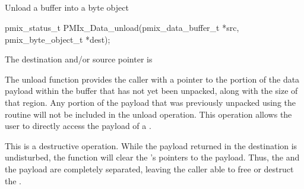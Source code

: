 \subsection{}

\summary

Unload a buffer into a byte object

\format

\cspecificstart
\begin{codepar}
pmix_status_t
PMIx_Data_unload(pmix_data_buffer_t *src,
                 pmix_byte_object_t *dest);
\end{codepar}
\cspecificend

\begin{arglist}
\end{arglist}

\returnstart
\begin{constantdesc}
\item {} The destination and/or source pointer is 
\end{constantdesc}
\returnend

\descr

The unload function provides the caller with a pointer to the
portion of the data payload within the buffer that has not yet been
unpacked, along with the size of that region. Any portion of
the payload that was previously unpacked using the 
routine will not be included in the unload operation. This operation allows the user to directly access the payload of a .

\adviceuserstart
This is a destructive operation. While the payload returned in the
destination  is
undisturbed, the function will clear the 's pointers to the
payload. Thus, the  and the payload are completely separated,
leaving the caller able to free or destruct the .
\adviceuserend



\subsection{}

